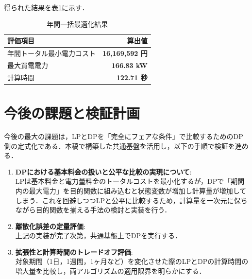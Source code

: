 \documentclass[a4paper,11pt,dvipdfmx]{jsarticle}
\begin{document}
得られた結果を表\ref{tab:baseline_results}に示す．

\begin{table}[H]
    \centering
    \caption{年間一括最適化結果}
    \label{tab:baseline_results}
    \begin{tabular}{lr}
        \toprule
        評価項目          & 算出値                   \\
        \midrule
        年間トータル最小電力コスト & \textbf{16,169,592 円} \\
        最大買電電力        & \textbf{166.83 kW}    \\
        計算時間          & \textbf{122.71 秒}     \\
        \bottomrule
    \end{tabular}
\end{table}

\section{今後の課題と検証計画}
今後の最大の課題は，LPとDPを「完全にフェアな条件」で比較するためのDP側の定式化である．本稿で構築した共通基盤を活用し，以下の手順で検証を進める．

\begin{enumerate}
    \item \textbf{DPにおける基本料金の扱いと公平な比較の実現について}: \\
          LPは基本料金と電力量料金のトータルコストを最小化するが，DPで「期間内の最大電力」を目的関数に組み込むと状態変数が増加し計算量が増加してしまう．これを回避しつつLPと公平に比較するため，計算量を一次元に保ちながら目的関数を揃える手法の検討と実装を行う．

    \item \textbf{離散化誤差の定量評価}: \\
          上記の実装が完了次第，共通基盤上でDPを実行する．

    \item \textbf{拡張性と計算時間のトレードオフ評価}: \\
          対象期間（1日，1週間，1ヶ月など）を変化させた際のLPとDPの計算時間の増大量を比較し，両アルゴリズムの適用限界を明らかにする．
\end{enumerate}
\end{document}

